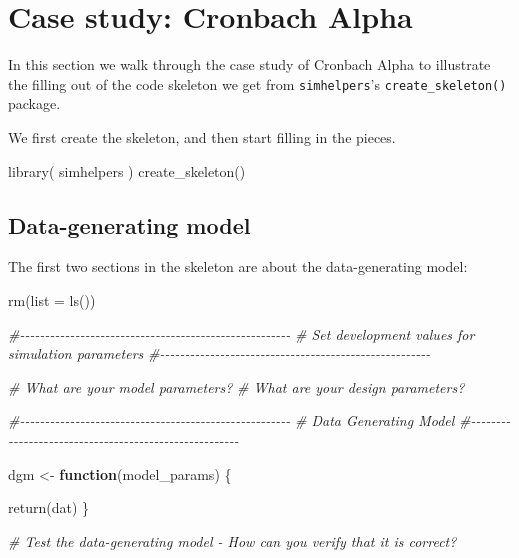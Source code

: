 \documentclass[
]{book}
\newenvironment{Shaded}{\begin{snugshade}}{\end{snugshade}}
\newcommand{\AttributeTok}[1]{\textcolor[rgb]{0.77,0.63,0.00}{#1}}
\newcommand{\CommentTok}[1]{\textcolor[rgb]{0.56,0.35,0.01}{\textit{#1}}}
\newcommand{\ControlFlowTok}[1]{\textcolor[rgb]{0.13,0.29,0.53}{\textbf{#1}}}
\newcommand{\FunctionTok}[1]{\textcolor[rgb]{0.00,0.00,0.00}{#1}}
\newcommand{\NormalTok}[1]{#1}
\newcommand{\OtherTok}[1]{\textcolor[rgb]{0.56,0.35,0.01}{#1}}
\begin{document}
\hypertarget{case_Cronbach}{%
\chapter{Case study: Cronbach Alpha}\label{case_Cronbach}}

In this section we walk through the case study of Cronbach Alpha to illustrate the filling out of the code skeleton we get from \texttt{simhelpers}'s \texttt{create\_skeleton()} package.

We first create the skeleton, and then start filling in the pieces.

\begin{Shaded}
\begin{Highlighting}[]
\FunctionTok{library}\NormalTok{( simhelpers )}
\FunctionTok{create\_skeleton}\NormalTok{()}
\end{Highlighting}
\end{Shaded}

\hypertarget{data-generating-model-1}{%
\section{Data-generating model}\label{data-generating-model-1}}

The first two sections in the skeleton are about the data-generating model:

\begin{Shaded}
\begin{Highlighting}[]
\FunctionTok{rm}\NormalTok{(}\AttributeTok{list =} \FunctionTok{ls}\NormalTok{())}

\CommentTok{\#{-}{-}{-}{-}{-}{-}{-}{-}{-}{-}{-}{-}{-}{-}{-}{-}{-}{-}{-}{-}{-}{-}{-}{-}{-}{-}{-}{-}{-}{-}{-}{-}{-}{-}{-}{-}{-}{-}{-}{-}{-}{-}{-}{-}{-}{-}{-}{-}{-}{-}{-}{-}{-}{-}}
\CommentTok{\# Set development values for simulation parameters}
\CommentTok{\#{-}{-}{-}{-}{-}{-}{-}{-}{-}{-}{-}{-}{-}{-}{-}{-}{-}{-}{-}{-}{-}{-}{-}{-}{-}{-}{-}{-}{-}{-}{-}{-}{-}{-}{-}{-}{-}{-}{-}{-}{-}{-}{-}{-}{-}{-}{-}{-}{-}{-}{-}{-}{-}{-}}

\CommentTok{\# What are your model parameters?}
\CommentTok{\# What are your design parameters?}

\CommentTok{\#{-}{-}{-}{-}{-}{-}{-}{-}{-}{-}{-}{-}{-}{-}{-}{-}{-}{-}{-}{-}{-}{-}{-}{-}{-}{-}{-}{-}{-}{-}{-}{-}{-}{-}{-}{-}{-}{-}{-}{-}{-}{-}{-}{-}{-}{-}{-}{-}{-}{-}{-}{-}{-}{-}}
\CommentTok{\# Data Generating Model}
\CommentTok{\#{-}{-}{-}{-}{-}{-}{-}{-}{-}{-}{-}{-}{-}{-}{-}{-}{-}{-}{-}{-}{-}{-}{-}{-}{-}{-}{-}{-}{-}{-}{-}{-}{-}{-}{-}{-}{-}{-}{-}{-}{-}{-}{-}{-}{-}{-}{-}{-}{-}{-}{-}{-}{-}{-}}

\NormalTok{dgm }\OtherTok{\textless{}{-}} \ControlFlowTok{function}\NormalTok{(model\_params) \{}

  \FunctionTok{return}\NormalTok{(dat)}
\NormalTok{\}}

\CommentTok{\# Test the data{-}generating model {-} How can you verify that it is correct?}
\end{Highlighting}
\end{Shaded}
\end{document}
